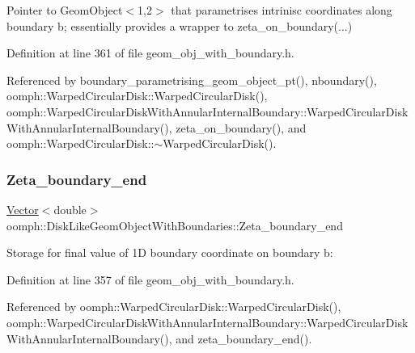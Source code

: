 Pointer to Geom\+Object$<$1,2$>$ that parametrises intrinisc coordinates along boundary b; essentially provides a wrapper to zeta\+\_\+on\+\_\+boundary(...) 



Definition at line 361 of file geom\+\_\+obj\+\_\+with\+\_\+boundary.\+h.



Referenced by boundary\+\_\+parametrising\+\_\+geom\+\_\+object\+\_\+pt(), nboundary(), oomph\+::\+Warped\+Circular\+Disk\+::\+Warped\+Circular\+Disk(), oomph\+::\+Warped\+Circular\+Disk\+With\+Annular\+Internal\+Boundary\+::\+Warped\+Circular\+Disk\+With\+Annular\+Internal\+Boundary(), zeta\+\_\+on\+\_\+boundary(), and oomph\+::\+Warped\+Circular\+Disk\+::$\sim$\+Warped\+Circular\+Disk().

\mbox{\label{classoomph_1_1DiskLikeGeomObjectWithBoundaries_af8de15d74e41b124f488fc1c3823ba7f}} 
\subsubsection{\texorpdfstring{Zeta\+\_\+boundary\+\_\+end}{Zeta\_boundary\_end}}
{\footnotesize\ttfamily \hyperlink{classoomph_1_1Vector}{Vector}$<$double$>$ oomph\+::\+Disk\+Like\+Geom\+Object\+With\+Boundaries\+::\+Zeta\+\_\+boundary\+\_\+end\hspace{0.3cm}{\ttfamily [protected]}}



Storage for final value of 1D boundary coordinate on boundary b\+: 



Definition at line 357 of file geom\+\_\+obj\+\_\+with\+\_\+boundary.\+h.



Referenced by oomph\+::\+Warped\+Circular\+Disk\+::\+Warped\+Circular\+Disk(), oomph\+::\+Warped\+Circular\+Disk\+With\+Annular\+Internal\+Boundary\+::\+Warped\+Circular\+Disk\+With\+Annular\+Internal\+Boundary(), and zeta\+\_\+boundary\+\_\+end().

\mbox{\label{classoomph_1_1DiskLikeGeomObjectWithBoundaries_a2d999734b8e0ddc2789ac1a9d18f5b68}} 

